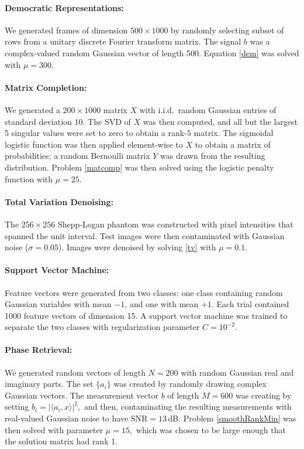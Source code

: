 \documentclass{amsart}
\newcommand{\ra}{\rangle}
\newcommand{\la}{\langle}
\theoremstyle{definition}
\begin{document}
\paragraph{\textbf{Democratic Representations:}} 
We generated frames of dimension $500\times 1000$ by randomly selecting subset of rows from a unitary discrete Fourier transform matrix.  The signal $b$ was a complex-valued random Gaussian vector of length 500.  Equation \eqref{dem} was solved with $\mu = 300.$

\paragraph{\textbf{Matrix Completion:}}
We generated a $200\times1000$ matrix $X$ with i.i.d.\ random Gaussian entries of standard deviation $10.$
The SVD of $X$ was then computed, and all but the largest 5 singular values were set to zero to obtain a rank-$5$ matrix.  The sigmoidal logistic function was then applied element-wise to $X$ to obtain a matrix of probabilities; a random Bernoulli matrix $Y$ was drawn from the resulting distribution.  Problem \eqref{matcomp} was then solved using the logistic penalty function with $\mu=25.$
     
 
\paragraph{\textbf{Total Variation Denoising:}}
 The $256\times256$ Shepp-Logan phantom was constructed with pixel intensities that spanned the unit interval.  Test images were then contaminated with Gaussian noise ($\sigma=0.05$).  Images were denoised by solving \eqref{tv} with $\mu=0.1.$

\paragraph{\textbf{Support Vector Machine:}}
 Feature vectors were generated from two classes: one class containing random Gaussian variables with mean $-1$, and one with mean $+1.$  Each trial contained 1000 feature vectors of dimension 15.  A support vector machine was trained to separate the two classes with regularization parameter $C=10^{-2}.$  
 
 
\paragraph{\textbf{Phase Retrieval:}}

We generated random vectors of length $N= 200$ with random Gaussian real and imaginary parts.  The set $\{a_i\}$ was created by randomly drawing complex Gaussian vectors.  The measurement vector $b$ of length $M = 600$ was creating by setting $b_i = |\la a_i,x\ra|^2,$ and then, contaminating the resulting measurements with real-valued Gaussian noise to have $\text{SNR}=13$\,dB.  Problem \eqref{smoothRankMin} was then solved with parameter $\mu=15,$ which was chosen to be large enough that the solution matrix had rank 1.
\end{document}
